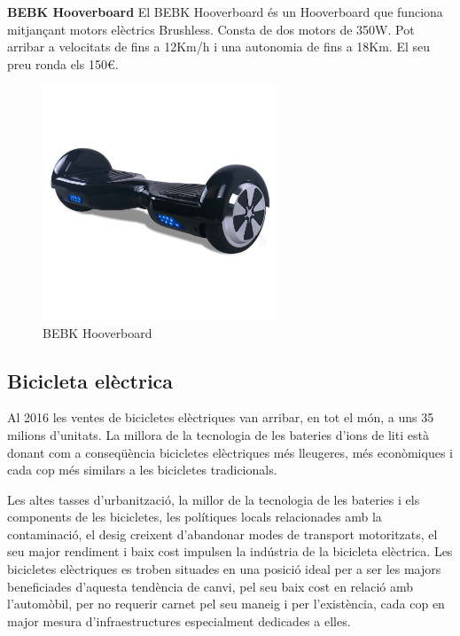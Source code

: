 \newpage

\textbf{BEBK Hooverboard} \bigskip  \newline %
El BEBK Hooverboard és un Hooverboard que funciona mitjançant motors elèctrics Brushless. Consta de dos motors de 350W. Pot arribar a velocitats de fins a 12Km/h i una autonomia de fins a 18Km. El seu preu ronda els 150€.
\begin{figure}[H]
		\centering
    	\includegraphics[width=7cm, height=7cm]{Marcteoric/bebkhooverboard.jpg}
     	\caption{BEBK Hooverboard}
\end{figure}

\subsection{Bicicleta elèctrica}
Al 2016 les ventes de bicicletes elèctriques van arribar, en tot el món, a uns 35 milions d'unitats. La millora de la tecnologia de les bateries d'ions de liti està donant com a conseqüència bicicletes elèctriques més lleugeres, més econòmiques i cada cop més similars a les bicicletes tradicionals.

Les altes tasses d'urbanització, la millor de la tecnologia de les bateries i els components de les bicicletes, les polítiques locals relacionades amb la contaminació, el desig creixent d'abandonar modes de transport motoritzats, el seu major rendiment i baix cost impulsen la indústria de la bicicleta elèctrica. Les bicicletes elèctriques es troben situades en una posició ideal per a ser les majors beneficiades d'aquesta tendència de canvi, pel seu baix cost en relació amb l'automòbil, per no requerir carnet pel seu maneig i per l'existència, cada cop en major mesura d'infraestructures especialment dedicades a elles. \newline \bigskip

